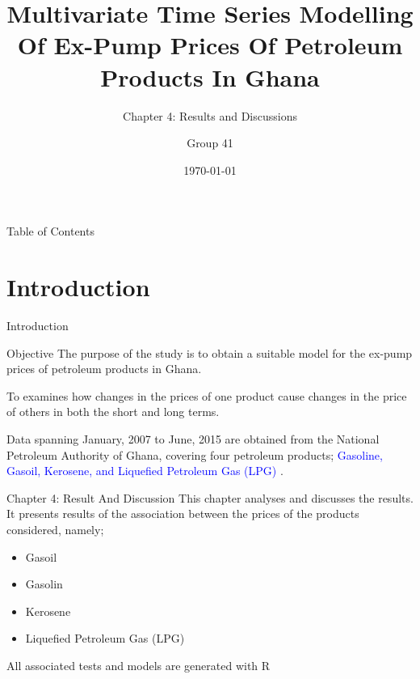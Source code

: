 \documentclass{beamer}
\title{Multivariate Time Series Modelling Of Ex-Pump Prices Of Petroleum Products In Ghana}
\subtitle{Chapter 4: Results and Discussions}
\author{Group 41}
\institute{Kwame Nkrumah University of Science and Technology}
\date{\today}
\newcommand{\startDate}{January, 2007 }
\newcommand{\finishDate}{June, 2015 }
\newcommand{\textHighlight}[1]{\textcolor{blue}{#1}}
\begin{document}
	
	\begin{frame}
		\titlepage
	\end{frame}

	\begin{frame}{Table of Contents}
		\tableofcontents
		
	\end{frame}
	
	\section{Introduction}
	\begin{frame}{Introduction}
		
		\begin{block}{Objective}
			The purpose of the study is to obtain a suitable model for the ex-pump prices of petroleum products in Ghana. 
		\end{block} \vspace{5pt}
		
		 To examines how changes in the prices of one product cause changes in the price of others in both the short and long terms. \par \vspace{5pt}
		
		Data spanning \startDate to \finishDate are obtained from the National Petroleum Authority of Ghana, covering four petroleum products; \textHighlight{Gasoline, Gasoil, Kerosene, and Liquefied Petroleum Gas (LPG) }. 
	\end{frame}
	
	\begin{frame}{Chapter 4: Result And Discussion}
		This chapter analyses and discusses the results. It presents results of the association between the prices of the products considered, namely; \vspace{5pt}
		
		\begin{itemize}
			\item Gasoil
			\item Gasolin
			\item Kerosene 
			\item Liquefied Petroleum Gas (LPG)
		\end{itemize} \vspace{5pt}
		
		All associated tests and models are generated with R 
	\end{frame}
	
\end{document}
